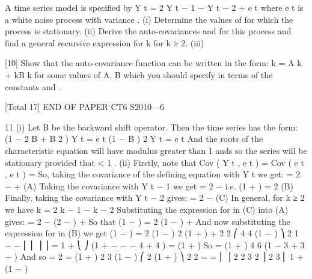 \documentclass[a4paper,12pt]{article}
\begin{document}
 
A time series model is specified by
Y t = 2 \alpha Y t − 1 −  Y t − 2 + e t
where e t is a white noise process with variance  .
(i) Determine the values of \alpha for which the process is stationary.
(ii) Derive the auto-covariances  and  for this process and find a general
recursive expression for \gamma k for k ≥ 2.
(iii)

[10]
Show that the auto-covariance function can be written in the form:
\gamma k = A \alpha k + kB \alpha k
for some values of A, B which you should specify in terms of the constants \alpha
and  .

[Total 17]
END OF PAPER
CT6 S2010—6

11
(i)
Let B be the backward shift operator. Then the time series has the form:
(1 − 2 \alpha B +  B 2 ) Y t = e t
(1 − \alpha B ) 2 Y t = e t
And the roots of the characteristic equation will have modulus greater than 1
ands so the series will be stationary provided that \alpha < 1 .
(ii)
Firstly, note that Cov ( Y t , e t ) = Cov ( e t , e t ) = 
So, taking the covariance of the defining equation with Y t we get:
 = 2 \alpha{} −   +  (A)
Taking the covariance with Y t − 1 we get
 = 2 \alpha{} −  
i.e. (1 +  )  = 2 \alpha{}
(B)
Finally, taking the covariance with Y t − 2 gives:
 = 2 \alpha{} −   (C)
In general, for k ≥ 2 we have \gamma k = 2 \alpha\gamma k − 1 −  \gamma k − 2
Substituting the expression for  in (C) into (A) gives:
 = 2 \alpha{} −  (2 \alpha{} −   ) + 
So that
(1 −  )  = 2 \alpha (1 −  )  + 
And now substituting the expression for  in (B) we get
(1 −  )  = 2 \alpha (1 −  )  \alpha{}
2
(1 + \alpha )
+ 
2
2
⎛
4 4 \alpha (1 − \alpha ) ⎞
2
1
−
\alpha
−
⎜ ⎜
⎟ ⎟  = 
1 + \alpha
⎝
⎠
(1 +  −  −  − 4  + 4  )  = (1 +  ) 
So  =
(1 +  )
4
6
(1 − 3 \alpha + 3 \alpha − \alpha )
And so  =
2
 =
(1 +  )
2 3
(1 − \alpha )
⎛ 2 \alpha (1 +  ) ⎞ 2
2 \alpha
=
\sigma
=
⎜
⎟
2
2 3
2 ⎟
2 3
⎜
1 + \alpha
(1 − \alpha )
\end{document}
